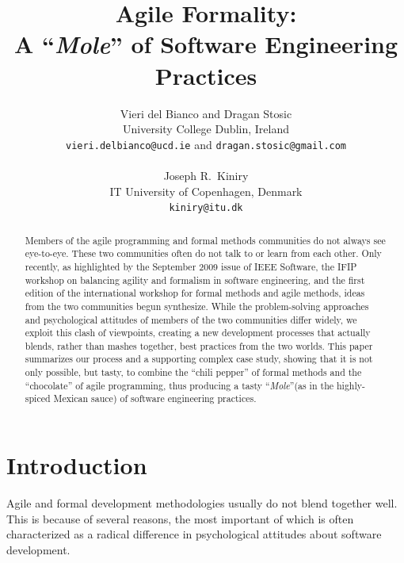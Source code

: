 \documentclass[english]{lni}
\newcommand{\mole}{``\emph{Mole}''\xspace}
\begin{document}
\title{Agile Formality:\\ A \mole of Software Engineering Practices}

\author{Vieri del Bianco and Dragan Stosic\\
  University College Dublin, Ireland\\
  \texttt{vieri.delbianco@ucd.ie} and \texttt{dragan.stosic@gmail.com}\\
  \\
  Joseph R.~Kiniry \\
  IT University of Copenhagen, Denmark\\
  \texttt{kiniry@itu.dk}
}

\maketitle

\begin{abstract}

Members of the agile programming and formal methods communities do not always see eye-to-eye.  
These two communities often do not talk to or learn from each other.  
Only recently, as highlighted by the September 2009 issue of IEEE Software, the IFIP workshop on balancing agility and formalism in software engineering, and the first edition of the international workshop for formal methods and agile methods, ideas from the two communities begun synthesize.  
While the problem-solving approaches and psychological attitudes of members of the two communities differ widely, we exploit this clash of viewpoints, creating a new development processes that actually blends, rather than mashes together, best practices from the two worlds.  
This paper summarizes our process and a supporting complex case study, showing that it is not only possible, but tasty, to combine the ``chili pepper'' of formal methods and the ``chocolate'' of agile programming, thus producing a tasty \mole (as in the highly-spiced Mexican sauce) of software engineering practices.

\end{abstract}



\section{Introduction}
\label{sec:introduction}

Agile and formal development methodologies usually do not blend together well.  
This is because of several reasons, the most important of which is often characterized as a radical difference in psychological attitudes about software development.  
\end{document}
